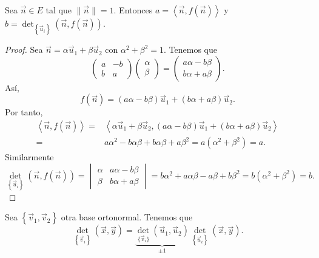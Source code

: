 \begin{ftheorem}[]
\normalfont Sea $\displaystyle \vec{n} \in E $ tal que $\displaystyle \|\vec{n}\| = 1 $. Entonces
$\displaystyle a = \left\langle \vec{n}, f\left(\vec{n}\right) \right\rangle  $ y $\displaystyle b = \det _{ \left\{ \vec{u}_{i}\right\} }\left(\vec{n}, f\left(\vec{n}\right)\right) $.
\end{ftheorem}
\begin{proof}
Sea $\displaystyle \vec{n} = \alpha \vec{u}_{1} + \beta \vec{u}_{2} $ con $\displaystyle \alpha^{2} + \beta^{2} = 1 $. Tenemos que
\[\begin{pmatrix} a & - b \\ b & a \end{pmatrix}\begin{pmatrix} \alpha \\ \beta  \end{pmatrix} = \begin{pmatrix} a \alpha - b \beta \\ b \alpha + a \beta  \end{pmatrix} .\]
Así, 
\[f\left(\vec{n}\right) = \left(a \alpha - b \beta \right)\vec{u}_{1} + \left(b \alpha + a \beta \right)\vec{u}_{2} .\]
Por tanto,
\[
\begin{split}
	\left\langle \vec{n}, f\left(\vec{n}\right) \right\rangle = & \left\langle \alpha \vec{u}_{1} + \beta \vec{u}_{2}, \left(a \alpha - b \beta \right)\vec{u}_{1} + \left(b \alpha + a \beta \right)\vec{u}_{2} \right\rangle \\
	= & a \alpha^{2} - b\alpha \beta + b\alpha \beta + a \beta^{2} = a \left(\alpha^{2} + \beta^{2}\right) = a .
\end{split}
\]
Similarmente
\[\det_{ \left\{ \vec{u}_{i}\right\} } \left(\vec{n}, f\left(\vec{n}\right)\right) = \begin{vmatrix} \alpha & a \alpha - b \beta \\ \beta & b \alpha + a \beta  \end{vmatrix} = b \alpha ^{2} + a \alpha \beta - a \beta + b \beta^{2} = b\left(\alpha^{2} + \beta^{2}\right) = b .\]
\end{proof}
\begin{observation}
\normalfont Sea $\displaystyle \left\{ \vec{v}_{1}, \vec{v}_{2}\right\}  $ otra base ortonormal. Tenemos que 
\[ \det_{ \left\{ \vec{v}_{i}\right\} }\left(\vec{x}, \vec{y}\right) = \underbrace{\det_{\{\vec{v}_{i}\}}\left(\vec{u}_{1}, \vec{u}_{2}\right)}_{\pm 1}\det_{ \left\{ \vec{u}_{i}\right\} }\left(\vec{x}, \vec{y}\right) .\]
\end{observation}
